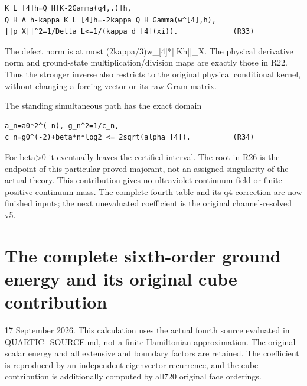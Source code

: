 \documentclass[11pt,a4paper]{article}
\let\originalsection\section
\renewcommand{\section}{\clearpage\originalsection}
\renewcommand{\[}{\begingroup\small\originaldisplaystart}
\renewcommand{\]}{\originaldisplayend\endgroup}
\begin{document}
\begin{verbatim}
K L_[4]h=Q_H[K-2Gamma(q4,.)]h,
Q_H A h-kappa K L_[4]h=-2kappa Q_H Gamma(w^[4],h),
||p_X||^2=1/Delta_L<=1/(kappa d_[4](xi)).             (R33)
\end{verbatim}

The defect norm is at most
{\ttfamily (\allowbreak{}2\allowbreak{}k\allowbreak{}a\allowbreak{}p\allowbreak{}p\allowbreak{}a\allowbreak{}/\allowbreak{}3\allowbreak{})\allowbreak{}w\allowbreak{}\_\allowbreak{}[\allowbreak{}4\allowbreak{}]\allowbreak{}*\allowbreak{}|\allowbreak{}|\allowbreak{}K\allowbreak{}h\allowbreak{}|\allowbreak{}|\allowbreak{}\_\allowbreak{}X\allowbreak{}}.
The physical derivative norm and ground-state multiplication/division
maps are exactly those in R22. Thus the stronger inverse also restricts
to the original physical conditional kernel, without changing a forcing
vector or its raw Gram matrix.

The standing simultaneous path has the exact domain

\begin{verbatim}
a_n=a0*2^(-n), g_n^2=1/c_n,
c_n=g0^(-2)+beta*n*log2 <= 2sqrt(alpha_[4]).          (R34)
\end{verbatim}

For beta\textgreater0 it eventually leaves the certified interval. The
root in R26 is the endpoint of this particular proved majorant, not an
assigned singularity of the actual theory. This contribution gives no
ultraviolet continuum field or finite positive continuum mass. The
complete fourth table and its q4 correction are now finished inputs; the
next unevaluated coefficient is the original channel-resolved v5.

\section{The complete sixth-order ground energy and its original cube
contribution}\label{the-complete-sixth-order-ground-energy-and-its-original-cube-contribution}

17 September 2026. This calculation uses the actual fourth source
evaluated in
{\ttfamily Q\allowbreak{}U\allowbreak{}A\allowbreak{}R\allowbreak{}T\allowbreak{}I\allowbreak{}C\allowbreak{}\_\allowbreak{}S\allowbreak{}O\allowbreak{}U\allowbreak{}R\allowbreak{}C\allowbreak{}E\allowbreak{}.\allowbreak{}m\allowbreak{}d\allowbreak{}},
not a finite Hamiltonian approximation. The original scalar energy and
all extensive and boundary factors are retained. The coefficient is
reproduced by an independent eigenvector recurrence, and the cube
contribution is additionally computed by all720 original face orderings.
\end{document}
